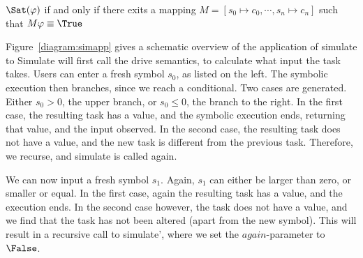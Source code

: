 \begin{figure*}
\caption{Application of the simulation function to Example~\ref{example:abs}}
\label{diagram:simapp}
\end{figure*}

\begin{definition}
  \label{def:Sat}
  $\Sat(\phi)$ if and only if there exits a mapping $M=[s_0\mapsto c_0,\cdots,s_n\mapsto c_n]$ such that $M\phi\equiv\True$
\end{definition}

Figure~\ref{diagram:simapp} gives a schematic overview of the application of simulate to
Simulate will first call the drive semantics, to calculate what input the task takes.
Users can enter a fresh symbol $s_0$, as listed on the left.
The symbolic execution then branches, since we reach a conditional.
Two cases are generated. Either $s_0>0$, the upper branch, or $s_0\leq0$, the  branch to the right.
In the first case, the resulting task has a value, and the symbolic execution ends, returning that value, and the input observed.
In the second case, the resulting task does not have a value, and the new task is different from the previous task.
Therefore, we recurse, and simulate is called again.

We can now input a fresh symbol $s_1$. Again, $s_1$ can either be larger than zero, or smaller or equal.
In the first case, again the resulting task has a value, and the execution ends.
In the second case however, the task does not have a value, and we find that the task has not been altered (apart from the new symbol).
This will result in a recursive call to simulate', where we set the $\mathit{again}$-parameter to $\False$.

